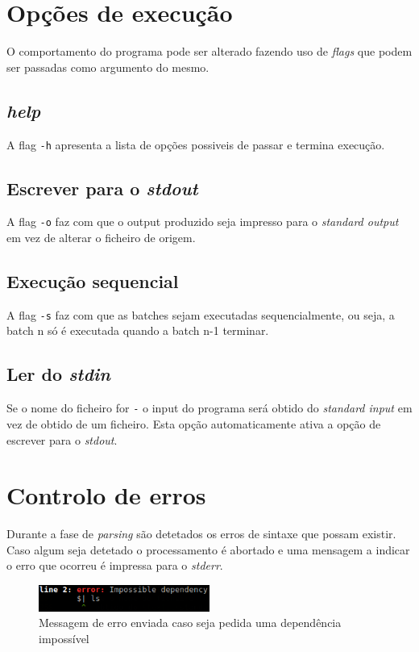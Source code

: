 \documentclass[12pt,a4paper]{report}
\begin{document}
\chapter{Opções de execução}
    O comportamento do programa pode ser alterado fazendo uso de \textit{flags}
    que podem ser passadas como argumento do mesmo.
    \section{\textit{help}}
        A flag \texttt{-h} apresenta a lista de opções possiveis
        de passar e termina execução.
    \section{Escrever para o \textit{stdout}}
        A flag \texttt{-o} faz com que o output produzido seja
        impresso para o \textit{standard output} em vez de alterar o ficheiro
        de origem.
    \section{Execução sequencial}
        A flag \texttt{-s} faz com que as batches sejam executadas
        sequencialmente, ou seja, a batch n só é executada quando a batch n-1
        terminar.
    \section{Ler do \textit{stdin}}
        Se o nome do ficheiro for \texttt{-} o input do programa será
        obtido do \textit{standard input} em vez de obtido de um ficheiro. Esta
        opção automaticamente ativa a opção de escrever para o \textit{stdout}.

\chapter{Controlo de erros}
    Durante a fase de \textit{parsing} são detetados os erros de sintaxe que possam
    existir. Caso algum seja detetado o processamento é abortado e uma mensagem
    a indicar o erro que ocorreu é impressa para o \textit{stderr}.

    \begin{figure}[h]
        \centering
        \includegraphics[width=0.5\textwidth]{./images/parseError.png}
        \caption{Messagem de erro enviada caso seja pedida uma dependência
                    impossível}
        \label{fig:parseError}
    \end{figure}
\end{document}
